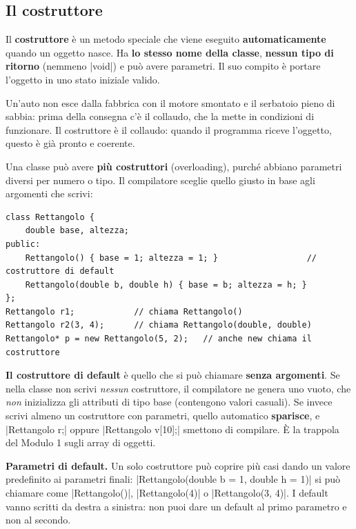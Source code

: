 \subsection*{Il costruttore}

\begin{definizione}[: costruttore]
Il \textbf{costruttore} è un metodo speciale che viene eseguito
\textbf{automaticamente} quando un oggetto nasce. Ha \textbf{lo stesso nome della
classe}, \textbf{nessun tipo di ritorno} (nemmeno \cc|void|) e può avere
parametri. Il suo compito è portare l'oggetto in uno stato iniziale valido.
\end{definizione}

\begin{analogia}
Un'auto non esce dalla fabbrica con il motore smontato e il serbatoio pieno di
sabbia: prima della consegna c'è il collaudo, che la mette in condizioni di
funzionare. Il costruttore è il collaudo: quando il programma riceve l'oggetto,
questo è già pronto e coerente.
\end{analogia}

Una classe può avere \textbf{più costruttori} (overloading), purché abbiano
parametri diversi per numero o tipo. Il compilatore sceglie quello giusto in base
agli argomenti che scrivi:
\begin{lstlisting}
class Rettangolo {
    double base, altezza;
public:
    Rettangolo() { base = 1; altezza = 1; }                  // costruttore di default
    Rettangolo(double b, double h) { base = b; altezza = h; }
};
Rettangolo r1;            // chiama Rettangolo()
Rettangolo r2(3, 4);      // chiama Rettangolo(double, double)
Rettangolo* p = new Rettangolo(5, 2);   // anche new chiama il costruttore
\end{lstlisting}

\textbf{Il costruttore di default} è quello che si può chiamare \textbf{senza
argomenti}. Se nella classe non scrivi \emph{nessun} costruttore, il compilatore
ne genera uno vuoto, che \emph{non} inizializza gli attributi di tipo base
(contengono valori casuali). Se invece scrivi almeno un costruttore con
parametri, quello automatico \textbf{sparisce}, e \cc|Rettangolo r;| oppure
\cc|Rettangolo v[10];| smettono di compilare. È la trappola del Modulo 1 sugli
array di oggetti.

\textbf{Parametri di default.} Un solo costruttore può coprire più casi dando un
valore predefinito ai parametri finali:
\cc|Rettangolo(double b = 1, double h = 1)| si può chiamare come
\cc|Rettangolo()|, \cc|Rettangolo(4)| o \cc|Rettangolo(3, 4)|. I default vanno
scritti da destra a sinistra: non puoi dare un default al primo parametro e non
al secondo.

